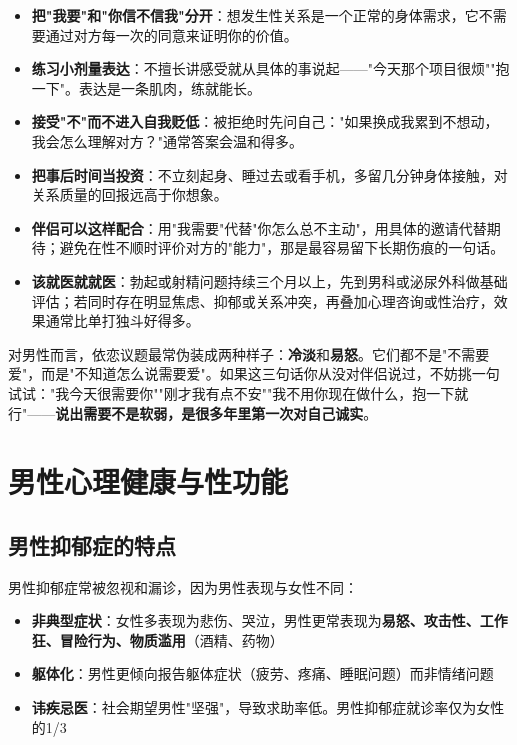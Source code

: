 \begin{itemize}
	\item \textbf{把"我要"和"你信不信我"分开}：想发生性关系是一个正常的身体需求，它不需要通过对方每一次的同意来证明你的价值。
	\item \textbf{练习小剂量表达}：不擅长讲感受就从具体的事说起——"今天那个项目很烦""抱一下"。表达是一条肌肉，练就能长。
	\item \textbf{接受"不"而不进入自我贬低}：被拒绝时先问自己："如果换成我累到不想动，我会怎么理解对方？"通常答案会温和得多。
	\item \textbf{把事后时间当投资}：不立刻起身、睡过去或看手机，多留几分钟身体接触，对关系质量的回报远高于你想象。
	\item \textbf{伴侣可以这样配合}：用"我需要"代替"你怎么总不主动"，用具体的邀请代替期待；避免在性不顺时评价对方的"能力"，那是最容易留下长期伤痕的一句话。
	\item \textbf{该就医就就医}：勃起或射精问题持续三个月以上，先到男科或泌尿外科做基础评估；若同时存在明显焦虑、抑郁或关系冲突，再叠加心理咨询或性治疗，效果通常比单打独斗好得多。
\end{itemize}

\begin{tcolorbox}[colback=pink!5!white,colframe=red!50!black,title=贴心小叮咛]
对男性而言，依恋议题最常伪装成两种样子：\textbf{冷淡}和\textbf{易怒}。它们都不是"不需要爱"，而是"不知道怎么说需要爱"。如果这三句话你从没对伴侣说过，不妨挑一句试试："我今天很需要你""刚才我有点不安""我不用你现在做什么，抱一下就行"——\textbf{说出需要不是软弱，是很多年里第一次对自己诚实}。
\end{tcolorbox}

\section{男性心理健康与性功能}
\label{sec:male_mental_health}

\subsection{男性抑郁症的特点}

男性抑郁症常被忽视和漏诊，因为男性表现与女性不同：

\begin{itemize}[leftmargin=2cm]
	\item \textbf{非典型症状}：女性多表现为悲伤、哭泣，男性更常表现为\textbf{易怒、攻击性、工作狂、冒险行为、物质滥用}（酒精、药物）
	\item \textbf{躯体化}：男性更倾向报告躯体症状（疲劳、疼痛、睡眠问题）而非情绪问题
	\item \textbf{讳疾忌医}：社会期望男性"坚强"，导致求助率低。男性抑郁症就诊率仅为女性的1/3
\end{itemize}

